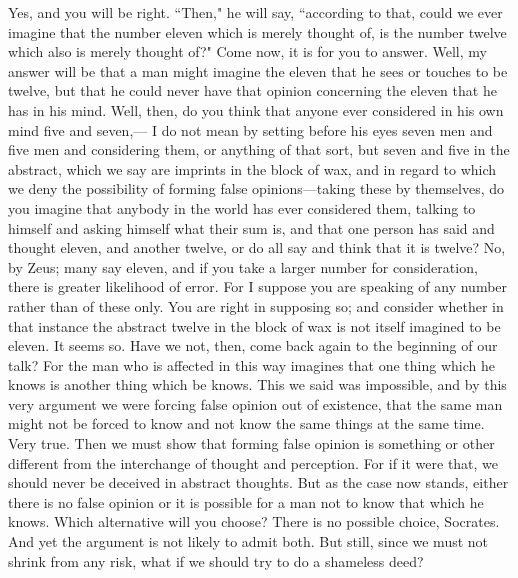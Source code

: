 \documentclass[letterpaper,12pt]{article}
\newcommand{\stephpag}[1]{\marginnote{\small\itshape\fontfamily{ppl}\selectfont #1}}
\begin{document}
\begin{drama}
\theaetetusspeaks
Yes, and you will be right. \stephpag{e}
\socratesspeaks
``Then," he will say, ``according to that, could we ever imagine that the number eleven which is merely thought of, is the number twelve which also is merely thought of?" Come now, it is for you to answer.
\theaetetusspeaks
Well, my answer will be that a man might imagine the eleven that he sees or touches to be twelve, but that he could never have that opinion concerning the eleven that he has in his mind.
\socratesspeaks
Well, then, do you think that anyone ever considered in his own mind five and seven,— \stephpag{196 a} I do not mean by setting before his eyes seven men and five men and considering them, or anything of that sort, but seven and five in the abstract, which we say are imprints in the block of wax, and in regard to which we deny the possibility of forming false opinions—taking these by themselves, do you imagine that anybody in the world has ever considered them, talking to himself and asking himself what their sum is, and that one person has said and thought eleven, and another twelve, or do all say and think that it is twelve?
\theaetetusspeaks
No, by Zeus; many say eleven, \stephpag{b} and if you take a larger number for consideration, there is greater likelihood of error. For I suppose you are speaking of any number rather than of these only.
\socratesspeaks
You are right in supposing so; and consider whether in that instance the abstract twelve in the block of wax is not itself imagined to be eleven.
\theaetetusspeaks
It seems so.
\socratesspeaks
Have we not, then, come back again to the beginning of our talk? For the man who is affected in this way imagines that one thing which he knows is another thing which be knows. This we said was impossible, and \stephpag{c} by this very argument we were forcing false opinion out of existence, that the same man might not be forced to know and not know the same things at the same time.
\theaetetusspeaks
Very true.
\socratesspeaks
Then we must show that forming false opinion is something or other different from the interchange of thought and perception. For if it were that, we should never be deceived in abstract thoughts. But as the case now stands, either there is no false opinion or it is possible for a man not to know that which he knows. Which alternative will you choose?
\theaetetusspeaks
There is no possible choice, Socrates. \stephpag{d}
\socratesspeaks
And yet the argument is not likely to admit both. But still, since we must not shrink from any risk, what if we should try to do a shameless deed?
\theaetetusspeaks

\end{drama}
\end{document}
